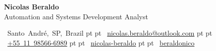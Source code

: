 \begin{header}
	\begin{twocolentry}
		{
			\raggedright
		}
		
		\color{DetailsColor}
		\fontsize{25 pt}{25 pt}\selectfont \textbf{Nicolas Beraldo}\\
		\color{primaryColor}
		\fontsize{13 pt}{13 pt}\selectfont Automation and Systems Development Analyst

		\normalsize
		\mbox{ Santo André, SP, Brazil}
		 pt
		\AND
		 pt
		\mbox{ \href{mailto:nicolas.beraldo@outlook.com}{nicolas.beraldo@outlook.com}}
		 pt
		\AND
		 pt
		\mbox{ \href{tel:+55 11 98566-6989}{+55 11 98566-6989}}
		 pt
		\AND
		 pt
		\mbox{ \href{https://www.linkedin.com/in/nicolas-beraldo}{nicolas-beraldo}}
		 pt
		\AND
		 pt
		\mbox{ \href{https://github.com/beraldonico}{beraldonico}}
	\end{twocolentry}
\end{header}